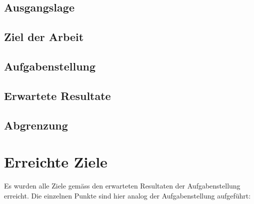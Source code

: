 \documentclass[
11pt, %
a4paper, %
BCOR25mm, %
DIV14, %
footsepline = false, %
headsepline, %
twoside, %
openright,
abstracton, %
listof=totocnumbered, %
bibliography=totocnumbered %
]{scrreprt}
\begin{document}
  \section{Ausgangslage}
  
  
  
  \section{Ziel der Arbeit}

  
  
  
  \section{Aufgabenstellung}
  
  
  
  \section{Erwartete Resultate}
  
  
  
  \section{Abgrenzung}
  
  
  
  \newpage
  
  
  \chapter{Erreichte Ziele}
  
  Es wurden alle Ziele gemäss den erwarteten Resultaten der Aufgabenstellung
  erreicht. Die einzelnen Punkte sind hier analog der Aufgabenstellung
  aufgeführt:
  
\end{document}
